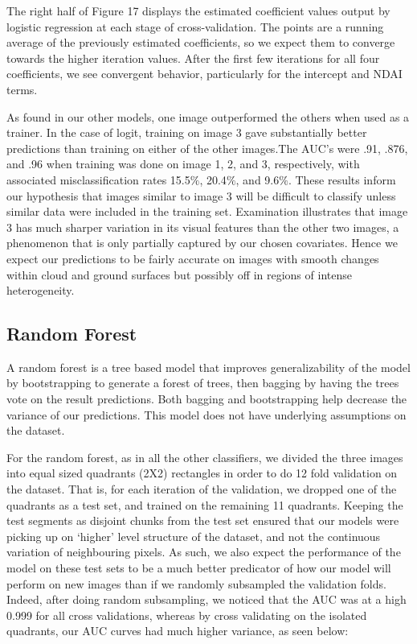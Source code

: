 \documentclass{article}\usepackage[]{graphicx}\usepackage[]{color}
\begin{document}
The right half of Figure 17 displays the estimated coefficient values output by logistic regression at each stage of cross-validation. The points are a running average of the previously estimated coefficients, so we expect them to converge towards the higher iteration values. After the first few iterations for all four coefficients, we see convergent behavior, particularly for the intercept and NDAI terms. 

As found in our other models, one image outperformed the others when used as a trainer. In the case of logit, training on image 3 gave substantially better predictions than training on either of the other images.The AUC's were .91, .876, and .96 when training was done on image 1, 2, and 3, respectively, with associated misclassification rates 15.5$\%$, 20.4$\%$, and 9.6$\%$. These results inform our hypothesis that images similar to image 3 will be difficult to classify unless similar data were included in the training set. Examination illustrates that image 3 has much sharper variation in its visual features than the other two images, a phenomenon that is only partially captured by our chosen covariates. Hence we expect our predictions to be fairly accurate on images with smooth changes within cloud and ground surfaces but possibly off in regions of intense heterogeneity.

\subsection{Random Forest}

A random forest is a tree based model that improves generalizability of the model by bootstrapping to generate a forest of trees, then bagging by having the trees vote on the result predictions.  Both bagging and bootstrapping help decrease the variance of our predictions. This model does not have underlying assumptions on the dataset.  

For the random forest, as in all the other classifiers, we divided the three images into equal sized quadrants (2X2) rectangles in order to do 12 fold validation on the dataset.  That is, for each iteration of the validation, we dropped one of the quadrants as a test set, and trained on the remaining 11 quadrants.  Keeping the test segments as disjoint chunks from the test set ensured that our models were picking up on `higher' level structure of the dataset, and not the continuous variation of neighbouring pixels.  As such, we also expect the performance of the model on these test sets to be a much better predicator of how our model will perform on new images than if we randomly subsampled the validation folds.  Indeed, after doing random subsampling, we noticed that the AUC was at a high 0.999 for all cross validations, whereas by cross validating on the isolated quadrants, our AUC curves had much higher variance, as seen below: \\
\end{document}
